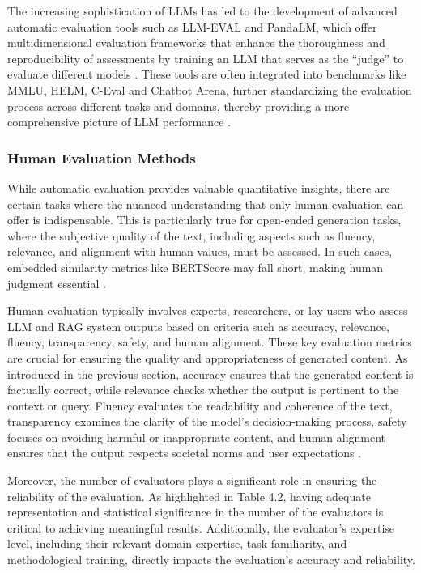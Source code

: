 The increasing sophistication of LLMs has led to the development of advanced automatic evaluation tools such as LLM-EVAL and PandaLM, which offer multidimensional evaluation frameworks that enhance the thoroughness and reproducibility of assessments by training an LLM that serves as the “judge” to evaluate different models \cite{lin2023llm, wang2023pandalm}. These tools are often integrated into benchmarks like MMLU, HELM, C-Eval and  Chatbot Arena, further standardizing the evaluation process across different tasks and domains, thereby providing a more comprehensive picture of LLM performance \cite{chang2024survey}.

\subsubsection{Human Evaluation Methods}

While automatic evaluation provides valuable quantitative insights, there are certain tasks where the nuanced understanding that only human evaluation can offer is indispensable. This is particularly true for open-ended generation tasks, where the subjective quality of the text, including aspects such as fluency, relevance, and alignment with human values, must be assessed. In such cases, embedded similarity metrics like BERTScore may fall short, making human judgment essential \cite{novikova2017we}.

Human evaluation typically involves experts, researchers, or lay users who assess LLM and RAG system outputs based on criteria such as accuracy, relevance, fluency, transparency, safety, and human alignment. These key evaluation metrics are crucial for ensuring the quality and appropriateness of generated content. As introduced in the previous section, accuracy ensures that the generated content is factually correct, while relevance checks whether the output is pertinent to the context or query. Fluency evaluates the readability and coherence of the text, transparency examines the clarity of the model’s decision-making process, safety focuses on avoiding harmful or inappropriate content, and human alignment ensures that the output respects societal norms and user expectations \cite{chang2024survey}.

Moreover, the number of evaluators plays a significant role in ensuring the reliability of the evaluation. As highlighted in Table 4.2, having adequate representation and statistical significance in the number of the evaluators is critical to achieving meaningful results. Additionally, the evaluator’s expertise level, including their relevant domain expertise, task familiarity, and methodological training, directly impacts the evaluation’s accuracy and reliability.

